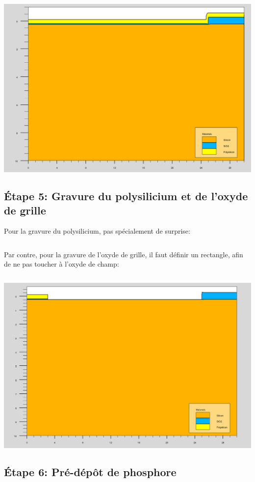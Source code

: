 \documentclass{article}
\begin{document}
\includegraphics[width=\linewidth]{4_poly.png}

\subsection{Étape 5: Gravure du polysilicium et de l’oxyde de grille}

Pour la gravure du polysilicium, pas spécialement de surprise:
\inputminted[linenos,firstnumber=51,firstline=51,lastline=52]{sh}{final_named.in}

Par contre, pour la gravure de l’oxyde de grille, il faut définir un rectangle, afin de ne pas toucher à l’oxyde de champ:
\inputminted[linenos,firstnumber=53,firstline=53,lastline=60]{sh}{final_named.in}

\includegraphics[width=\linewidth]{5gate.png}

\subsection{Étape 6: Pré-dépôt de phosphore}
\end{document}
